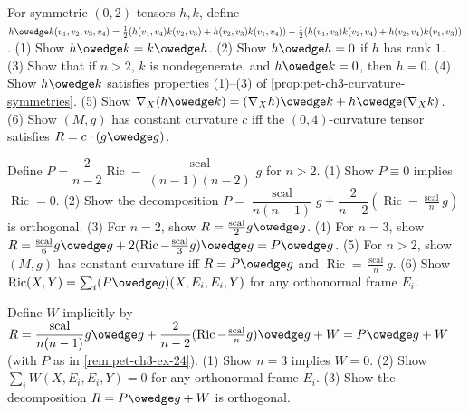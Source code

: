 \begin{remark}
  \label{rem:pet-ch3-ex-23}


  For symmetric $(0,2)$-tensors $h,k$, define
  $h\owedge k(v_1,v_2,v_3,v_4)=\tfrac12(h(v_1,v_4)k(v_2,v_3)+h(v_2,v_3)k(v_1,v_4))
  -\tfrac12(h(v_1,v_3)k(v_2,v_4)+h(v_2,v_4)k(v_1,v_3))$. (1) Show $h\owedge
  k=k\owedge h$. (2) Show $h\owedge h=0$ if $h$ has rank $1$. (3) Show that if
  $n>2$, $k$ is nondegenerate, and $h\owedge k=0$, then $h=0$. (4) Show $h\owedge
  k$ satisfies properties (1)--(3) of \cref{prop:pet-ch3-curvature-symmetries}.
  (5) Show $\nabla_X(h\owedge k)=(\nabla_Xh)\owedge k+h\owedge(\nabla_Xk)$. (6)
  Show $(M,g)$ has constant curvature $c$ iff the $(0,4)$-curvature tensor
  satisfies $R=c\cdot(g\owedge g)$.
\end{remark}

\begin{remark}
  \label{rem:pet-ch3-ex-24}


  Define $P=\dfrac2{n-2}\operatorname{Ric}-\dfrac{\operatorname{scal}}{(n-1)(n-2)}g$
  for $n>2$. (1) Show $P\equiv0$ implies $\operatorname{Ric}=0$. (2) Show the
  decomposition
  $P=\dfrac{\operatorname{scal}}{n(n-1)}g+\dfrac2{n-2}(\operatorname{Ric}-\tfrac{\operatorname{scal}}ng)$
  is orthogonal. (3) For $n=2$, show $R=\tfrac{\operatorname{scal}}2g\owedge g$.
  (4) For $n=3$, show
  $R=\tfrac{\operatorname{scal}}6g\owedge g+2(\operatorname{Ric}-\tfrac{\operatorname{scal}}3g)\owedge
  g=P\owedge g$. (5) For $n>2$, show $(M,g)$ has constant curvature iff
  $R=P\owedge g$ and $\operatorname{Ric}=\tfrac{\operatorname{scal}}ng$. (6) Show
  $\operatorname{Ric}(X,Y)=\sum_i(P\owedge g)(X,E_i,E_i,Y)$ for any orthonormal
  frame $E_i$.
\end{remark}

\begin{remark}
  \label{rem:pet-ch3-ex-25}


  Define $W$ implicitly by
  $R=\dfrac{\operatorname{scal}}{n(n-1)}g\owedge g+\dfrac2{n-2}(\operatorname{Ric}-\tfrac{\operatorname{scal}}ng)\owedge
  g+W=P\owedge g+W$ (with $P$ as in \cref{rem:pet-ch3-ex-24}). (1) Show $n=3$
  implies $W=0$. (2) Show $\sum_iW(X,E_i,E_i,Y)=0$ for any orthonormal frame
  $E_i$. (3) Show the decomposition $R=P\owedge g+W$ is orthogonal.
\end{remark}

